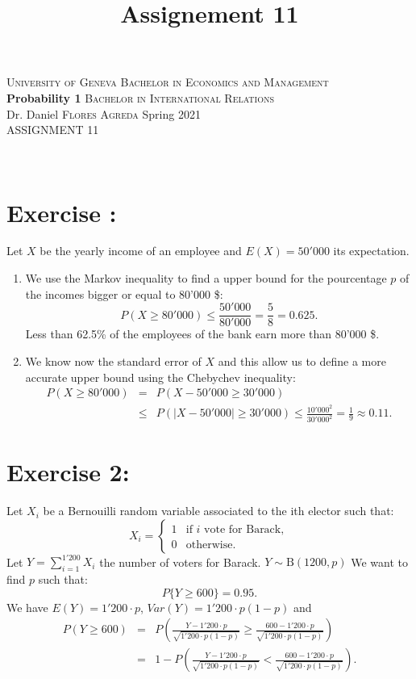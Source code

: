 \documentclass[12pt,thmsa]{article}\usepackage[]{graphicx}\usepackage[]{color}
\title{Assignement 11}
\begin{document}
\noindent \textsc{University of Geneva}     \hfill \textsc{Bachelor in Economics and Management} \\
\textbf{Probability 1}                      \hfill \textsc{Bachelor in International Relations} \\
Dr. Daniel \textsc{Flores Agreda}                 \hfill Spring 2021  \\
ASSIGNMENT 11



\noindent
\makebox[\linewidth]{\rule{\textwidth}{0.4pt}}\\[1.5ex]




\addtocounter{section}{1}
\section*{Exercise \thesection:}

Let $X$ be the yearly income of an employee and $E(X)=50'000$ its expectation.
\begin{enumerate}
  \item We use the Markov inequality to find a upper bound for the pourcentage $p$ of the incomes bigger or equal to 80'000 \$:
  \begin{equation*}
P(X \geq 80'000)\leq \frac{50'000}{80'000}=\frac{5}{8}=0.625.
  \end{equation*}
  Less than 62.5\% of the employees of the bank earn more than 80'000 \$.
  \item We know now the standard error of $X$  and this allow us to define a more accurate upper bound using the Chebychev inequality:
 \begin{eqnarray*}
 P(X\geq 80'000)&=& P(X-50'000\geq 30'000) \\
 &\leq&P(\vert X- 50'000\vert \geq 30'000)\leq \frac{10'000^2}{30'000^2}=\frac{1}{9} \approx 0.11.
 \end{eqnarray*}
\end{enumerate}




\section*{Exercise 2:}

Let $X_i$ be a Bernouilli random variable associated to the ith elector such that:
$$
X_i =\left\{
\begin{array}{ll}
1 & \mbox{if }i \mbox{ vote for Barack},\\
0 & \mbox{otherwise}.
\end{array}
\right.
$$
Let $\displaystyle Y=\sum_{i=1}^{1'200} X_i$ the number of voters for Barack. $Y\sim \mathrm B( 1200, p)$ We want to find $p$ such that:
$$
P\{Y\geq 600\} = 0.95.
$$
We have $E(Y)=1'200\cdot p$, $Var(Y)=1'200\cdot p(1-p)$ and
\begin{eqnarray*}
P (Y\geq 600) &=& P\left(\frac{Y-1'200 \cdot p}{\sqrt{1'200\cdot p(1-p)}} \geq \frac{600
- 1'200\cdot p}{\sqrt{1'200\cdot p(1-p)}}\right)   \\
&=& 1 -P\left(\frac{Y-1'200\cdot p}{\sqrt{1'200\cdot p(1-p)}} < \frac{600
- 1'200\cdot p}{\sqrt{1'200\cdot p(1-p)}}\right).
\end{eqnarray*}
\end{document}
